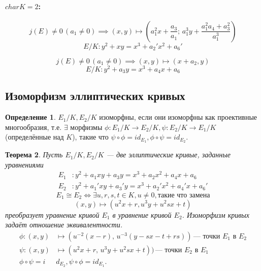 \documentclass[12pt]{article}
\newtheorem{theorem}{Теорема}
\theoremstyle{definition}
\newtheorem{definition}[theorem]{Определение}
\theoremstyle{definition}
\theoremstyle{definition}
\begin{document}
            \paragraph{$char K = 2$:} 
            \[
            j(E)\neq0 \, (a_1\neq0) \implies (x, y) \mapsto (a_1^2x+\frac{a_3}{a_1}; \, a_1^3y + \frac{a_1^2a_4+a_3^2}{a_1^3})
            \]
            \begin{equation}
                E/K: y^2+xy=x^3+a_2'x^2+a_6'
            \end{equation}
            
            \[
            j(E)\neq0 \, (a_1\neq0) \implies (x, y) \mapsto (x+a_2, y)
            \]
            \begin{equation}
                E/K: y^2+a_3y = x^3+a_4x+a_6
            \end{equation}
            
        \subsection{Изоморфизм эллиптических кривых}
            \begin{definition} 
                $E_1/K, E_2/K$ изоморфны, если они изоморфны как проективные многообразия, т.е. $\exists$ морфизмы $\phi: E_1/K \to E_2/K, \psi: E_2/K \to E_1/K$ (определённые над $K$), такие что $\psi \circ \phi = id_{E_1}, \phi \circ \psi = id_{E_2}$.
            \end{definition}
            
            \begin{theorem}
                Пусть $E_1/K, E_2/K$ — две эллиптические кривые, заданные уравнениями 
                \begin{align}
                    E_1&: y^2+a_1xy + a_3y = x^3 + a_2x^2 + a_4x + a_6 \\ \nonumber
                    E_2&: y^2+a_1'xy + a_3'y = x^3 + a_2'x^2 + a_4'x + a_6'
                \end{align}
                \begin{equation*}
                E_1 \cong E_2 \iff \exists u,r,s,t \in K, u\neq0, \text{такие что замена}
                \end{equation*}
                \begin{equation}
                    (x,y) \mapsto (u^2x+r, u^3y+ u^2sx+t)
                \end{equation}
                преобразует уравнение кривой $E_1$ в уравнение кривой $E_2$. Изоморфизм кривых задаёт отношение эквивалентности.
                \begin{align*}
                    \phi : (x,y)&\mapsto (u^{-2}(x-r), \,u^{-3}(y-sx-t+rs))\,\text{— точки $E_1$ в $E_2$} \\
                    \psi : (x,y)&\mapsto (u^2x+r, \,u^3y+u^2sx+t))\, \text{— точки $E_2$ в $E_1$} \\
                    \phi \circ \psi = i&d_{E_2}, \psi \circ \phi = id_{E_1}.
                \end{align*}
            \end{theorem}
            
\end{document}
